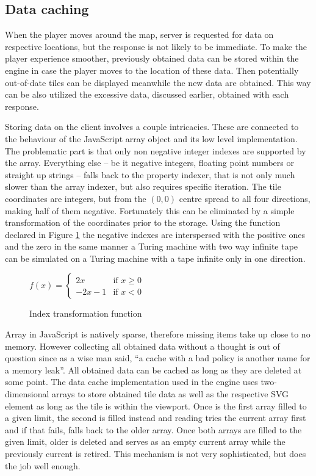 \documentclass[11pt,oneside, final]{fithesis2}
\begin{document}
\subsection{Data caching}
When the player moves around the map, server is requested for data on respective locations, but the response is not likely to be immediate. To make the player experience smoother, previously obtained data can be stored within the engine in case the player moves to the location of these data. Then potentially out-of-date tiles can be displayed meanwhile the new data are obtained. This way can be also utilized the excessive data, discussed earlier, obtained with each response.

Storing data on the client involves a couple intricacies. These are connected to the behaviour of the JavaScript array object and its low level implementation. The problematic part is that only non negative integer indexes are supported by the array\cite{ecma}. Everything else -- be it negative integers, floating point numbers or straight up strings -- falls back to the property indexer, that is not only much slower than the array indexer, but also requires specific iteration. The tile coordinates are integers, but from the $(0,0)$ centre spread to all four directions, making half of them negative. Fortunately this can be eliminated by a simple transformation of the coordinates prior to the storage. Using the function declared in Figure \ref{indextransformation} the negative indexes are interspersed with the positive ones and the zero in the same manner a Turing machine with two way infinite tape can be simulated on a Turing machine with a tape infinite only in one direction.

\begin{figure}[h]
\centering
\begin{math}
f(x) = 
\left\{
	\begin{array}{ll}
		2x  & \mbox{if } x \geq 0\\
		-2x - 1 & \mbox{if } x < 0
	\end{array}
\right.
\end{math}
\caption{Index transformation function}
\label{indextransformation}
\end{figure}

Array in JavaScript is natively sparse, therefore missing items take up close to no memory\cite{javascriptarray}. However collecting all obtained data without a thought is out of question since as a wise man said, ``a cache with a bad policy is another name for a memory leak''\cite{chen}. All obtained data can be cached as long as they are deleted at some point. The data cache implementation used in the engine uses two-dimensional arrays to store obtained tile data as well as the respective SVG element as long as the tile is within the viewport. Once is the first array filled to a given limit, the second is filled instead and reading tries the current array first and if that fails, falls back to the older array. Once both arrays are filled to the given limit, older is deleted and serves as an empty current array while the previously current is retired. This mechanism is not very sophisticated, but does the job well enough.
\end{document}
